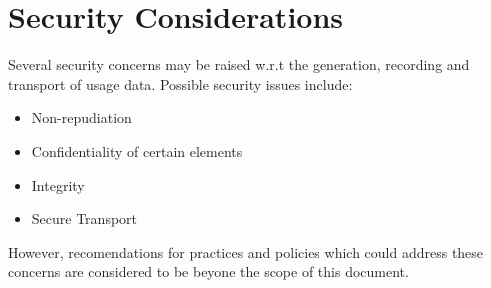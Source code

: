 
\section{Security Considerations}
\label{s:security}

Several security concerns may be raised w.r.t the generation, recording and transport of usage data. Possible security issues include:
\begin{itemize}
\item Non-repudiation
\item Confidentiality of certain elements
\item Integrity
\item Secure Transport
\end{itemize}
However, recomendations for practices and policies which could address these concerns are considered to be beyone the scope of this document.